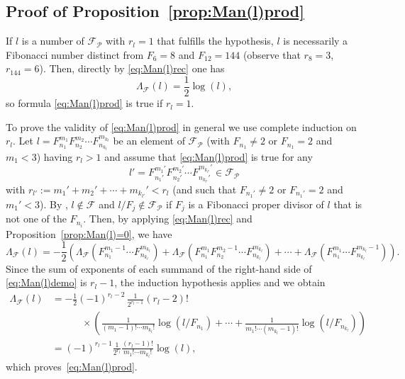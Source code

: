 \documentclass[11pt, a4paper]{article}
\newcommand{\calF}{\mathcal{F}}
\newcommand{\manF}{\Lambda_{\mathcal{F}}}
\newcommand{\Fp}{\mathcal{F}_{\mathcal{P}}}
\theoremstyle{plain}
\theoremstyle{definition}
\begin{document}
\subsection{Proof of Proposition~\ref{prop:Man(l)prod}}

If $l$ is a number of $\Fp$ with $r_{l}=1$ that fulfills the hypothesis, 
$l$ is necessarily a Fibonacci number distinct from $F_{6}=8$ and $F_{12}=144$
(observe that $r_{8}=3$, $r_{144}=6$). Then, directly by \eqref{eq:Man(l)rec} one has 
\[
\manF(l) = \frac{1}{2} \log(l), 
\]
so formula \eqref{eq:Man(l)prod} is true if $r_{l}=1$. 

To prove the validity of \eqref{eq:Man(l)prod} in general we use complete induction on $r_{l}$. Let $l = F_{n_1}^{m_1} F_{n_2}^{m_2} \cdots F_{n_{k_l}}^{m_{k_l}}$ be an element of $\Fp$ (with $F_{n_1} \neq 2$ or $F_{n_1}=2$ and $m_1<3$) having $r_{l}>1$ and assume that \eqref{eq:Man(l)prod} is true for any 
\[
l' = F_{n_1'}^{m_1'} F_{n_2'}^{m_2'} 
\cdots F_{n_{k_{l'}}'}^{m_{k_{l'}}'} \in \Fp
\]
with 
$r_{l'} := m_1' + m_2' + \cdots + m_{k_{l'}}' < r_{l}$
(and such that $F_{n_1'} \neq 2$ or $F_{n_1'}=2$ and $m_1'<3$).
By \cite{BuLuMiSi, Car}, $l\notin \calF$ and $l/F_j \notin \Fp$ 
if $F_j$ is a Fibonacci proper divisor of $l$ that is not one of the $F_{n_{i}}$.
Then, by applying \eqref{eq:Man(l)rec} and Proposition~\ref{prop:Man(l)=0}, we have 
\begin{equation}
\label{eq:Man(l)demo}
\manF(l) = -\frac{1}{2} \left(  \manF(F_{n_1}^{m_1-1} \cdots F_{n_{k_l}}^{m_{k_l}})
+ \manF(F_{n_1}^{m_1}F_{n_2}^{m_2-1} \cdots F_{n_{k_l}}^{m_{k_l}})
+ \cdots + \manF(F_{n_1}^{m_1} \cdots F_{n_{k_l}}^{m_{k_l}-1}) \right) .
\end{equation}
Since the sum of exponents of each summand of the right-hand side of \eqref{eq:Man(l)demo}
is $r_l-1$, the induction hypothesis applies and we obtain
\begin{align*}
\manF(l) &= -\frac{1}{2}(-1)^{r_l-2} \,\frac{1}{2^{r_l-1}}(r_l-2)! \\
& \qquad\quad \times
\left( \frac{1}{(m_1-1)! \cdots m_{k_l}!} \log (l/F_{n_1}) + \cdots 
+ \frac{1}{m_1! \cdots (m_{k_l}-1)!} \log (l/F_{n_{k_l}}) \right) \\
&= (-1)^{r_l-1}\frac{1}{2^{r_l}} \frac{(r_l-1)!}{m_1! \cdots m_{k_l}!} \log(l), 
\end{align*}
which proves~\eqref{eq:Man(l)prod}. 
\end{document}
